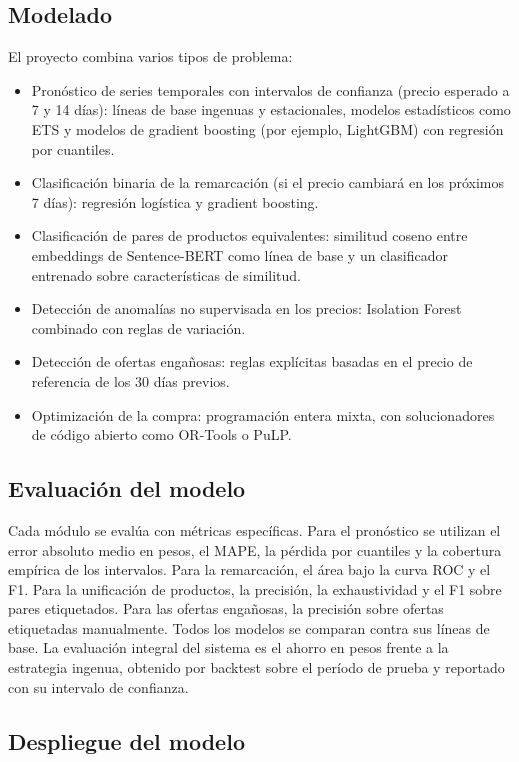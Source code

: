 \documentclass[
11pt, %
]{charter}
\begin{document}
\subsection{Modelado}

El proyecto combina varios tipos de problema:

\begin{itemize}
	\item Pronóstico de series temporales con intervalos de confianza (precio esperado a 7 y 14 días): líneas de base ingenuas y estacionales, modelos estadísticos como ETS y modelos de gradient boosting (por ejemplo, LightGBM) con regresión por cuantiles.
	\item Clasificación binaria de la remarcación (si el precio cambiará en los próximos 7 días): regresión logística y gradient boosting.
	\item Clasificación de pares de productos equivalentes: similitud coseno entre embeddings de Sentence-BERT como línea de base y un clasificador entrenado sobre características de similitud.
	\item Detección de anomalías no supervisada en los precios: Isolation Forest combinado con reglas de variación.
	\item Detección de ofertas engañosas: reglas explícitas basadas en el precio de referencia de los 30 días previos.
	\item Optimización de la compra: programación entera mixta, con solucionadores de código abierto como OR-Tools o PuLP.
\end{itemize}

\subsection{Evaluación del modelo}

Cada módulo se evalúa con métricas específicas. Para el pronóstico se utilizan el error absoluto medio en pesos, el MAPE, la pérdida por cuantiles y la cobertura empírica de los intervalos. Para la remarcación, el área bajo la curva ROC y el F1. Para la unificación de productos, la precisión, la exhaustividad y el F1 sobre pares etiquetados. Para las ofertas engañosas, la precisión sobre ofertas etiquetadas manualmente. Todos los modelos se comparan contra sus líneas de base. La evaluación integral del sistema es el ahorro en pesos frente a la estrategia ingenua, obtenido por backtest sobre el período de prueba y reportado con su intervalo de confianza.

\subsection{Despliegue del modelo}
\end{document}
